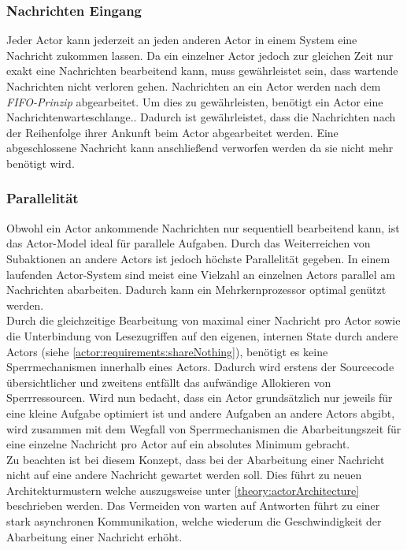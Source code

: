 \subsubsection{Nachrichten Eingang}\label{actor:Mailbox}
Jeder Actor kann jederzeit an jeden anderen Actor in einem System eine Nachricht zukommen lassen. Da ein einzelner Actor jedoch zur gleichen Zeit nur exakt eine Nachrichten bearbeitend kann, muss gewährleistet sein, dass wartende Nachrichten nicht verloren gehen. Nachrichten an ein Actor werden nach dem \textit{FIFO-Prinzip} abgearbeitet. 
 Um dies zu gewährleisten, benötigt ein Actor eine Nachrichtenwarteschlange.\citep{Agha1985ActorsSystems}.  Dadurch ist gewährleistet, dass die Nachrichten nach der Reihenfolge ihrer Ankunft beim Actor abgearbeitet werden. Eine abgeschlossene Nachricht kann anschließend verworfen werden da sie nicht mehr benötigt wird. 

\subsubsection{Parallelität}\label{actor:parallelism}
Obwohl ein Actor ankommende Nachrichten nur sequentiell bearbeitend kann, ist das Actor-Model ideal für parallele Aufgaben.\citep{hewitt1973session} Durch das Weiterreichen von Subaktionen an andere Actors ist jedoch höchste Parallelität gegeben. In einem laufenden Actor-System sind meist eine Vielzahl an einzelnen Actors parallel am Nachrichten abarbeiten. Dadurch kann ein Mehrkernprozessor optimal genützt werden. \citep{Agha1985ActorsSystems} \\
Durch die gleichzeitige Bearbeitung von maximal einer Nachricht pro Actor sowie die Unterbindung von Lesezugriffen auf den eigenen, internen State durch andere Actors (siehe \ref{actor:requirements:shareNothing}), benötigt es keine Sperrmechanismen innerhalb eines Actors. Dadurch wird erstens der Sourcecode übersichtlicher und zweitens entfällt das aufwändige Allokieren von Sperrressourcen.\citep{Vernon2015ReactiveAkka}
Wird nun bedacht, dass ein Actor grundsätzlich nur jeweils für eine kleine Aufgabe optimiert ist und andere Aufgaben an andere Actors abgibt, wird zusammen mit dem Wegfall von Sperrmechanismen die Abarbeitungszeit für eine einzelne Nachricht pro Actor auf ein absolutes Minimum gebracht. \citep{Vernon2015ReactiveAkka} \\
Zu beachten ist bei diesem Konzept, dass bei der Abarbeitung einer Nachricht nicht auf eine andere Nachricht gewartet werden soll. Dies führt zu neuen Architekturmustern welche auszugsweise unter \ref{theory:actorArchitecture} beschrieben werden. Das Vermeiden von warten auf Antworten führt zu einer stark asynchronen Kommunikation, welche wiederum die Geschwindigkeit der Abarbeitung einer Nachricht erhöht.

